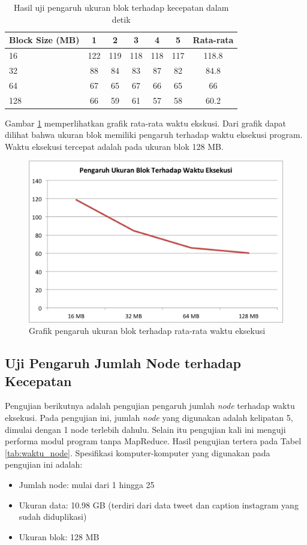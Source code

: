 \begin{table}
	\centering
	\begin{tabular}{| l | c | c | c | c | c | c |}
		\hline
		Block Size (MB)	& 1 & 2 & 3 & 4 & 5 & Rata-rata  \\
		\hline
		16 	& 122	& 119	& 118	& 118	& 117  & 118.8 \\
		32		& 88	& 84	& 83	& 87	& 82 & 84.8\\
		64		& 67	& 65	& 67	& 66	& 65 & 66\\
		128	& 66	& 59	& 61	& 57	& 58 & 60.2\\
		\hline
	\end{tabular}	
	\caption{Hasil uji pengaruh ukuran blok terhadap kecepatan dalam detik} \label{tab:waktu_blok}
\end{table}	

Gambar \ref{fig:eks_block_size} memperlihatkan grafik rata-rata waktu ekskusi. Dari grafik dapat dilihat bahwa ukuran blok memiliki pengaruh terhadap waktu eksekusi program. Waktu eksekusi tercepat adalah pada ukuran blok 128 MB.

\begin{figure}[H]
	\centering
	\includegraphics[scale=0.5]{Gambar/eks-block-size.png}
	\caption[Grafik pengaruh ukuran blok terhadap rata-rata waktu eksekusi]{Grafik pengaruh ukuran blok terhadap rata-rata waktu eksekusi} 
	\label{fig:eks_block_size}
\end{figure}

\subsection{Uji Pengaruh Jumlah Node terhadap Kecepatan}
Pengujian berikutnya adalah pengujian pengaruh jumlah \textit{node} terhadap waktu eksekusi. Pada pengujian ini, jumlah \textit{node} yang digunakan adalah kelipatan 5, dimulai dengan 1 node terlebih dahulu. Selain itu pengujian kali ini menguji performa modul program tanpa MapReduce. Hasil pengujian tertera pada Tabel \ref{tab:waktu_node}. Spesifikasi komputer-komputer yang digunakan pada pengujian ini adalah:
\begin{itemize}
	\item Jumlah node: mulai dari 1 hingga 25 
	\item Ukuran data: 10.98 GB (terdiri dari data tweet dan caption instagram yang sudah diduplikasi)
	\item Ukuran blok: 128 MB
\end{itemize}

